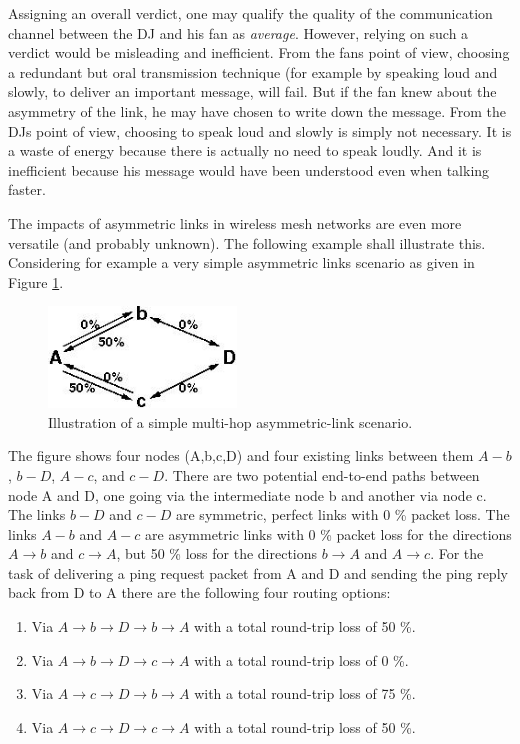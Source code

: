 \documentclass[11pt]{article}
\begin{document}
%
Assigning an overall verdict, one may qualify the quality of the communication channel between the DJ and his fan as \emph{average}.
%
However, relying on such a verdict would be misleading and inefficient.
%
From the fans point of view, choosing a redundant but oral transmission technique (for example by speaking loud and slowly, to deliver an important message, will fail.
%
But if the fan knew about the asymmetry of the link, he may have chosen to write down the message.
%
From the DJs point of view, choosing to speak loud and slowly is simply not necessary.
It is a waste of energy because there is actually no need to speak loudly. And it is inefficient because his message would have been understood even when talking faster.
%


The impacts of asymmetric links in wireless mesh networks are even more versatile (and probably unknown). The following example shall illustrate this.
%
Considering for example a very simple asymmetric links scenario as given in Figure \ref{fig:asymmetric-path}.


\begin{figure}[htbp]
  \begin{center}
    \includegraphics[width=5cm]{asymmetricPathChaos.jpg}
    \caption{Illustration of a simple multi-hop asymmetric-link scenario.}
    \label{fig:asymmetric-path}
  \end{center}
\end{figure}


The figure shows four nodes (A,b,c,D) and four existing links between them $A-b$, $b-D$, $A-c$, and $c-D$. There are two potential end-to-end paths between node A and D, one going via the intermediate node b and another via node c.
%
The links $b-D$ and $c-D$ are symmetric, perfect links with 0 \% packet loss.
%
The links $ A - b $ and $ A - c $ are asymmetric links with 0 \% packet loss for the directions $ A \rightarrow b $ and $ c \rightarrow A $, but 50 \% loss for the directions $ b \rightarrow A $ and $ A \rightarrow c $.
%
For the task of delivering a ping request packet from A and D and sending the ping reply back from D to A there are the following four routing options:
\begin{enumerate}
 \item Via $ A \rightarrow b \rightarrow D \rightarrow b \rightarrow A $ with a total round-trip loss of 50 \%.
 \item Via $ A \rightarrow b \rightarrow D \rightarrow c \rightarrow A $ with a total round-trip loss of 0 \%.
 \item Via $ A \rightarrow c \rightarrow D \rightarrow b \rightarrow A $ with a total round-trip loss of 75 \%.
 \item Via $ A \rightarrow c \rightarrow D \rightarrow c \rightarrow A $ with a total round-trip loss of 50 \%.
\end{enumerate}
\end{document}
